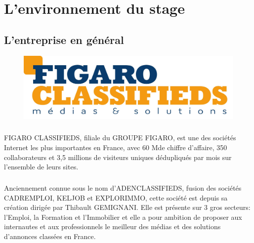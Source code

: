 
\chapter{L'environnement du stage} %

\label{environnement} %


\section{L'entreprise en général}
\begin{figure}[h]
  \centering
  \includegraphics[scale=0.15]{Pictures/logoFC.jpg}
\end{figure}
\paragraph{}
FIGARO CLASSIFIEDS, filiale du GROUPE FIGARO, est une des sociétés Internet les plus importantes en France, avec 60 M\texteuro de chiffre d'affaire, 350 collaborateurs et 3,5 millions de visiteurs uniques dédupliqués par mois sur l’ensemble de leurs sites.
\paragraph{}
Anciennement connue sous le nom d'ADENCLASSIFIEDS, fusion des sociétés CADREMPLOI, KELJOB et EXPLORIMMO, cette société est depuis sa création dirigée par Thibault GEMIGNANI.
Elle est présente sur 3 gros secteurs: l’Emploi, la Formation et l’Immobilier et elle a pour ambition de proposer aux internautes et aux professionnels le meilleur des médias et des solutions d'annonces classées en France.
